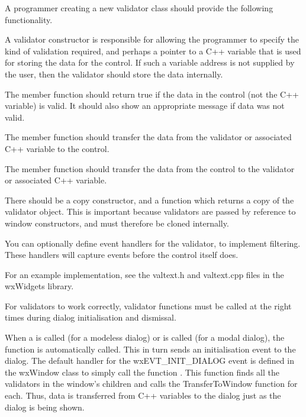 
A programmer creating a new validator class should provide the following functionality.

A validator constructor is responsible for allowing the programmer to specify the kind
of validation required, and perhaps a pointer to a C++ variable that is used for storing the
data for the control. If such a variable address is not supplied by the user, then
the validator should store the data internally.

The  member function should return
true if the data in the control (not the C++ variable) is valid. It should also show
an appropriate message if data was not valid.

The  member function should
transfer the data from the validator or associated C++ variable to the control.

The  member function should
transfer the data from the control to the validator or associated C++ variable.

There should be a copy constructor, and a  function
which returns a copy of the validator object. This is important because validators
are passed by reference to window constructors, and must therefore be cloned internally.

You can optionally define event handlers for the validator, to implement filtering. These handlers
will capture events before the control itself does.

For an example implementation, see the valtext.h and valtext.cpp files in the wxWidgets library.


For validators to work correctly, validator functions must be called at the right times during
dialog initialisation and dismissal.

When a  is called (for a modeless dialog)
or  is called (for a modal dialog),
the function  is automatically called.
This in turn sends an initialisation event to the dialog. The default handler for
the wxEVT\_INIT\_DIALOG event is defined in the wxWindow class to simply call
the function . This
function finds all the validators in the window's children and calls the TransferToWindow
function for each. Thus, data is transferred from C++ variables to the dialog
just as the dialog is being shown.

